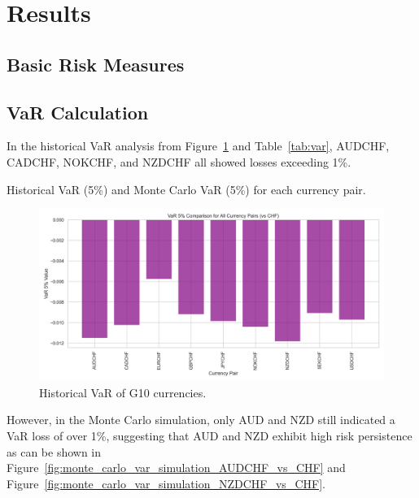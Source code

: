 \documentclass{article}
\begin{document}
\section{Results}
\subsection{Basic Risk Measures}

\subsection{VaR Calculation}
In the historical VaR analysis from Figure~\ref{fig:historical_VaR} and Table~\ref{tab:var}, AUDCHF, CADCHF, NOKCHF, and NZDCHF all showed losses exceeding 1\%. 

\begin{table}[H]
\centering
\caption{Historical VaR (5\%) and Monte Carlo VaR (5\%) for each currency pair.} 
\label{tab:var}
\end{table}

\begin{figure}[H]
    \centering   \includegraphics[width=0.75\linewidth]{reports/figures/var_5_percent_comparison_plot.png}
    \caption{Historical VaR of G10 currencies.}
    \label{fig:historical_VaR}
\end{figure}

However, in the Monte Carlo simulation, only AUD and NZD still indicated a VaR loss of over 1\%, suggesting that AUD and NZD exhibit high risk persistence as can be shown in Figure~\ref{fig:monte_carlo_var_simulation_AUDCHF_vs_CHF} and Figure~\ref{fig:monte_carlo_var_simulation_NZDCHF_vs_CHF}.
\end{document}
